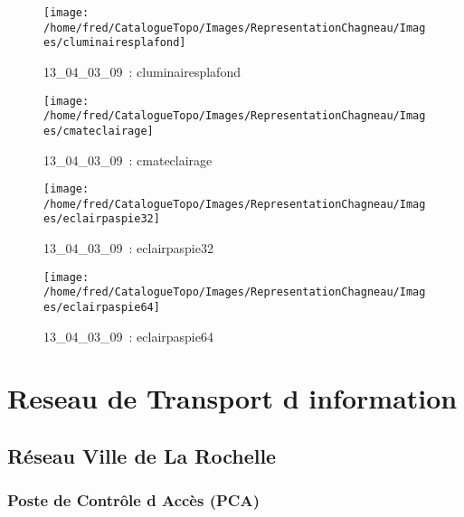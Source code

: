 \documentclass[12pt,titlepage]{book}
\begin{document}
\begin{figure}[h!]
\begin{minipage}[t]{3cm}
  \end{minipage}
  \begin{minipage}[t]{3cm}
    \begin{center}
      \texttt{[image: /home/fred/CatalogueTopo/Images/RepresentationChagneau/Images/cluminairesplafond]}
      \caption[~13\_04\_03\_09]{\small{13\_04\_03\_09~:} \tiny{cluminairesplafond}}\label{cluminairesplafond}
    \end{center}
  \end{minipage}
  \begin{minipage}[t]{3cm}
    \begin{center}
      \texttt{[image: /home/fred/CatalogueTopo/Images/RepresentationChagneau/Images/cmateclairage]}
      \caption[~13\_04\_03\_09]{\small{13\_04\_03\_09~:} \tiny{cmateclairage}}\label{cmateclairage}
    \end{center}
  \end{minipage}
  \begin{minipage}[t]{3cm}
    \begin{center}
      \texttt{[image: /home/fred/CatalogueTopo/Images/RepresentationChagneau/Images/eclairpaspie32]}
      \caption[~13\_04\_03\_09]{\small{13\_04\_03\_09~:} \tiny{eclairpaspie32}}\label{eclairpaspie32}
    \end{center}
  \end{minipage}
  \begin{minipage}[t]{3cm}
    \begin{center}
      \texttt{[image: /home/fred/CatalogueTopo/Images/RepresentationChagneau/Images/eclairpaspie64]}
      \caption[~13\_04\_03\_09]{\small{13\_04\_03\_09~:} \tiny{eclairpaspie64}}\label{eclairpaspie64}
    \end{center}
  \end{minipage}
\end{figure}
\chapter{Reseau de Transport d information}
\section{\large Réseau Ville de La Rochelle}
\subsection{Poste de Contrôle d Accès (PCA)}
\noindent
\vspace{\baselineskip}
\end{document}
